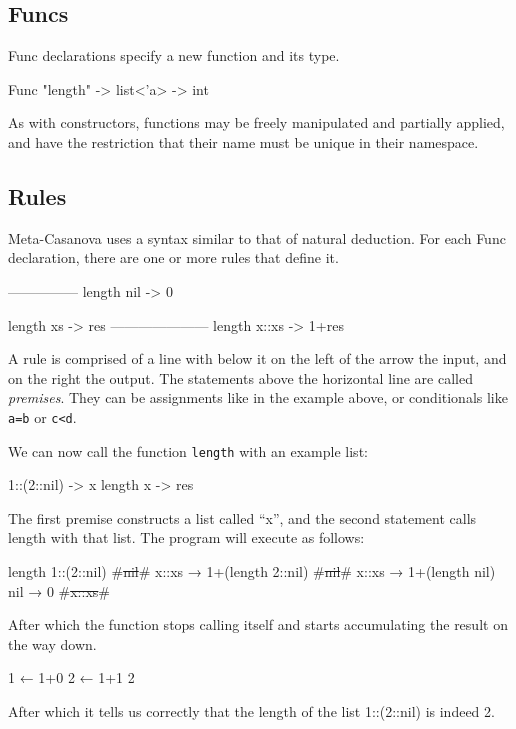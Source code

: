   \subsection{Funcs}
  Func declarations specify a new function and its type.

  \begin{code}
  Func "length" -> list<'a> -> int
  \end{code}

  As with constructors, functions may be freely manipulated and partially applied, and have the restriction that their name must be unique in their namespace.

  \subsection{Rules}
  Meta-Casanova uses a syntax similar to that of natural deduction.
  For each Func declaration, there are one or more rules that define it.

  \begin{code}
  ---------------
  length nil -> 0

  length xs -> res
  ---------------------
  length x::xs -> 1+res
  \end{code}
  
  A rule is comprised of a line with below it on the left of the arrow the input, and on the right the output.
  The statements above the horizontal line are called \textit{premises}.
  They can be assignments like in the example above, or conditionals like \verb|a=b| or \verb|c<d|.

  We can now call the function \verb|length| with an example list:

  \begin{code}
    1::(2::nil) -> x
    length x    -> res
  \end{code}

  The first premise constructs a list called ``x'', and the second statement calls length with that list.
  The program will execute as follows:

  \begin{code}
  length 1::(2::nil)
      #\st{nil}#
      x::xs → 1+(length 2::nil)
          #\st{nil}#
          x::xs → 1+(length nil)
              nil → 0
              #\st{x::xs}#
  \end{code}

  \noindent
  After which the function stops calling itself and starts accumulating the result on the way down.
  
  \begin{code}[gobble=2]
          1 ← 1+0
      2 ← 1+1
  2
  \end{code}

  \noindent
  After which it tells us correctly that the length of the list 1::(2::nil) is indeed 2.
